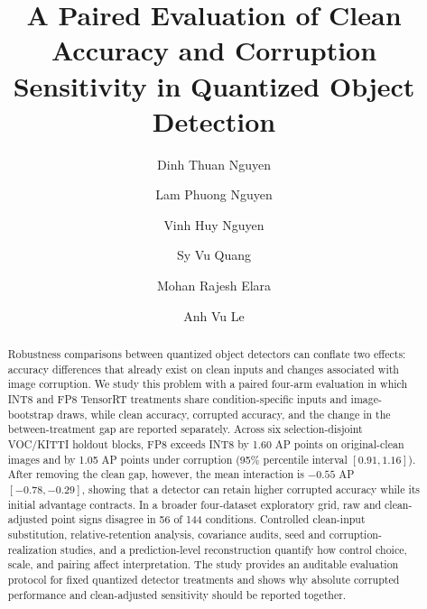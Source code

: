 \documentclass[a4paper,fleqn]{cas-dc}
\def\corref#1{}%
\def\orcidlink#1{}%
\begin{document}
\begin{titlepage}

\title[mode=title]{A Paired Evaluation of Clean Accuracy and Corruption Sensitivity in Quantized Object Detection}
\author[mymainaddress]{Dinh Thuan Nguyen\orcidlink{0009-0008-6467-203X}}
\author[mymainaddress]{Lam Phuong Nguyen\orcidlink{0009-0007-3439-5871}}
\author[mysecondaryaddress]{Vinh Huy Nguyen\orcidlink{0009-0006-0878-9714}}
\author[mythirthaddress]{Sy Vu Quang}
\author[fourthaddress]{Mohan Rajesh Elara\orcidlink{0000-0001-6504-1530}}
\author[mythirthaddress]{Anh Vu Le\orcidlink{0000-0002-4804-7540}\corref{mycorrespondingauthor}}

\address[mymainaddress]{Faculty of Electrical and Electronics Engineering, Ton Duc Thang University, Ho Chi Minh City, Vietnam}
\address[mysecondaryaddress]{Center of Visualization and Simulation, Duy Tan University, Da Nang, Vietnam}
\address[mythirthaddress]{Advanced Intelligent Technology Research Group, Faculty of Electrical and Electronics Engineering, Ton Duc Thang University, 19 Nguyen Huu Tho Street, Tan Phong Ward, District 7, Ho Chi Minh City 700000, Vietnam}
\address[fourthaddress]{ROAR Lab, Engineering Product Development, Singapore University of Technology and Design, Singapore}

\begin{abstract}
Robustness comparisons between quantized object detectors can conflate two effects: accuracy differences that already exist on clean inputs and changes associated with image corruption. We study this problem with a paired four-arm evaluation in which INT8 and FP8 TensorRT treatments share condition-specific inputs and image-bootstrap draws, while clean accuracy, corrupted accuracy, and the change in the between-treatment gap are reported separately. Across six selection-disjoint VOC/KITTI holdout blocks, FP8 exceeds INT8 by 1.60 AP points on original-clean images and by 1.05 AP points under corruption (95\% percentile interval $[0.91,1.16]$). After removing the clean gap, however, the mean interaction is $-0.55$ AP $[-0.78,-0.29]$, showing that a detector can retain higher corrupted accuracy while its initial advantage contracts. In a broader four-dataset exploratory grid, raw and clean-adjusted point signs disagree in 56 of 144 conditions. Controlled clean-input substitution, relative-retention analysis, covariance audits, seed and corruption-realization studies, and a prediction-level reconstruction quantify how control choice, scale, and pairing affect interpretation. The study provides an auditable evaluation protocol for fixed quantized detector treatments and shows why absolute corrupted performance and clean-adjusted sensitivity should be reported together.
\end{abstract}


\end{titlepage}
\end{document}
